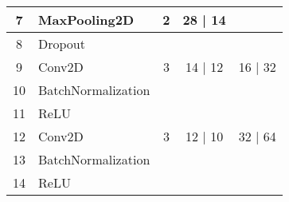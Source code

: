 \documentclass[10pt,a4paper]{article}
\begin{document}
\begin{table}[]
\begin{tabular}{|c|l|c|c|c|}
7                  & MaxPooling2D                             & 2                                                              & 28 | 14                                                                     &                                                                            \\ \hline
8                  & Dropout                                  &                                                                &                                                                             &                                                                            \\ \hline
9                  & Conv2D                                   & 3                                                              & 14 | 12                                                                     & 16 | 32                                                                    \\ \hline
10                 & BatchNormalization                       &                                                                &                                                                             &                                                                            \\ \hline
11                 & ReLU                                     &                                                                &                                                                             &                                                                            \\ \hline
12                 & Conv2D                                   & 3                                                              & 12 | 10                                                                     & 32 | 64                                                                    \\ \hline
13                 & BatchNormalization                       &                                                                &                                                                             &                                                                            \\ \hline
14                 & ReLU                                     &                                                                &                                                                             &                                                                            \\ \hline

\end{tabular}
\end{table}
\end{document}
